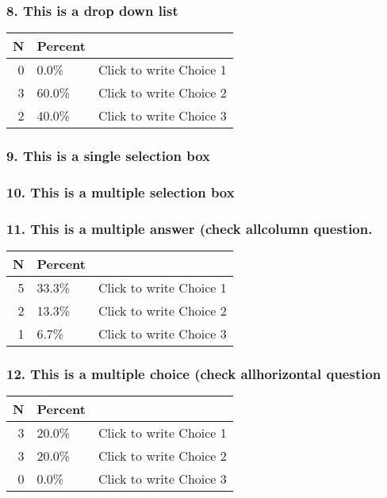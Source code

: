 \documentclass{article}\usepackage[]{graphicx}\usepackage[]{color}
\begin{document}
\hfill \break \hfill \break
\subsubsection*{8.
This is a drop down list}

\begin{tabular}{r|l|l}
\hline
N & Percent & \\
\hline
0 & 0.0\% & Click to write Choice 1\\
\hline
3 & 60.0\% & Click to write Choice 2\\
\hline
2 & 40.0\% & Click to write Choice 3\\
\hline
\end{tabular}


\hfill \break \hfill \break
\subsubsection*{9.
This is a single selection box}

\hfill \break \hfill \break
\subsubsection*{10.
This is a multiple selection box}

\hfill \break \hfill \break
\subsubsection*{11.
This is a multiple answer (check allcolumn question.}

\begin{tabular}{r|l|l}
\hline
N & Percent & \\
\hline
5 & 33.3\% & Click to write Choice 1\\
\hline
2 & 13.3\% & Click to write Choice 2\\
\hline
1 & 6.7\% & Click to write Choice 3\\
\hline
\end{tabular}


\hfill \break \hfill \break
\subsubsection*{12.
This is a multiple choice (check allhorizontal question}

\begin{tabular}{r|l|l}
\hline
N & Percent & \\
\hline
3 & 20.0\% & Click to write Choice 1\\
\hline
3 & 20.0\% & Click to write Choice 2\\
\hline
0 & 0.0\% & Click to write Choice 3\\
\hline
\end{tabular}
\end{document}
